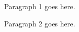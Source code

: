 \documentclass{book}
\begin{document}
\begingroup
\beginnumbering
\numberpstarttrue

\autopar

Paragraph 1 goes here.


Paragraph 2 goes here.


\endnumbering
\endgroup
\end{document}
